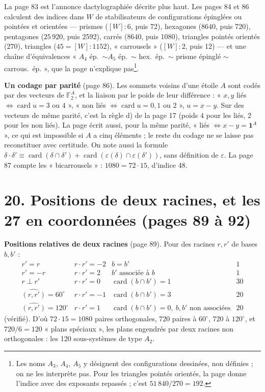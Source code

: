 \documentclass[11pt,a4paper]{article}
\begin{document}
La page 83 est l'annonce dactylographiée décrite plus haut. Les pages 84 et 86
calculent des indices dans $W$ de stabilisateurs de configurations épinglées
ou pointées et orientées --- prismes ($[W] : 6$, puis 72), hexagones
($8640$, puis 720), pentagones ($25\,920$, puis 2592), carrés ($8640$, puis
1080), triangles pointés orientés ($270$), triangles ($45 = [W] : 1152$),
« carrousels » ($[W] : 2$, puis 12) --- et une chaîne d'équivalences
« $A_4$ ép.\ $\sim A_5$ ép.\ $\sim$ hex.\ ép.\ $\sim$ prisme épinglé $\sim$
carrous.\ ép. », que la page n'explique pas\footnote{Les noms $A_3$, $A_4$,
$A_5$ y désignent des configurations dessinées, non définies ; on ne les
interprète pas. Pour les triangles pointés orientés, la page donne l'indice
avec des exposants repassés ; c'est $51\,840/270 = 192$.}.

\textbf{Un codage par parité} (page 86). Les sommets voisins d'une étoile
$A$ sont codés par des vecteurs de $\mathbb{F}_2^A$, et la liaison par le poids
de leur différence : « $x, y$ liés $\iff \operatorname{card} u = 3$ ou $4$ »,
« non liés $\iff \operatorname{card} u = 0, 1$ ou $2$ », $u = x - y$. Sur des
vecteurs de même parité, c'est la règle d) de la page 17 (poids 4 pour les
liés, 2 pour les non liés). La page écrit aussi, pour la même parité, « liés
$\iff x - y = \mathbf{1}^A$ », ce qui est impossible si $A$ a cinq éléments ;
le reste du codage ne se laisse pas reconstituer avec certitude. On note
aussi la formule $\delta \cdot \delta' \equiv \operatorname{card}(\delta \cap
\delta') + \operatorname{card}(\varepsilon(\delta) \cap \varepsilon(\delta'))$,
sans définition de $\varepsilon$. La page 87 compte les « bicarrousels » :
$1080 = 72 \cdot 15$, d'indice 48.

\section*{20. Positions de deux racines, et les 27 en coordonnées (pages 89 à
92)}

\textbf{Positions relatives de deux racines} (page 89). Pour des racines $r,
r'$ de bases $b, b'$ :
\[
\begin{array}{llll}
r' = r & r \cdot r' = -2 & b = b' & 1 \\
r' = -r & r \cdot r' = 2 & b' \text{ associée à } b & 1 \\
r \perp r' & r \cdot r' = 0 & \operatorname{card}(b \cap b') = 1 & 30 \\
\widehat{(r, r')} = 60^\circ & r \cdot r' = -1 & \operatorname{card}(b \cap b')
= 3 & 20 \\
\widehat{(r, r')} = 120^\circ & r \cdot r' = 1 & \operatorname{card}(b \cap b')
= 0, \ b, b' \text{ non associées} & 20
\end{array}
\]
(vérifié). D'où $72 \cdot 15 = 1080$ paires orthogonales, $720$ paires à
$60^\circ$, $720$ à $120^\circ$, et $720/6 = 120$ « plans spéciaux », les plans
engendrés par deux racines non orthogonales : les 120 sous-systèmes de type
$A_2$.
\end{document}

